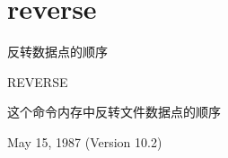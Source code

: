 \section{reverse}
\label{cmd:reverse}

反转数据点的顺序

REVERSE

这个命令内存中反转文件数据点的顺序

May 15, 1987 (Version 10.2)

